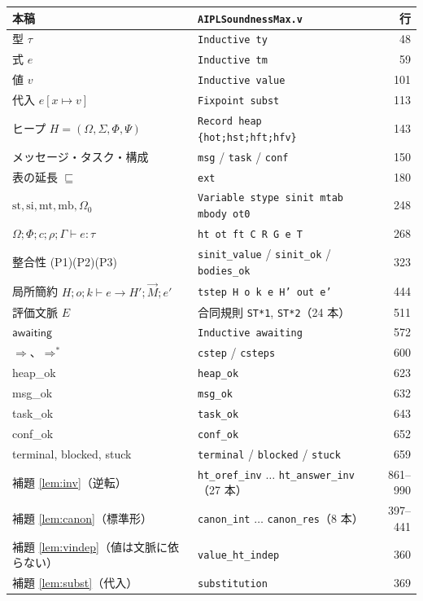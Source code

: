 \documentclass[11pt,a4paper]{ltjsarticle}
\theoremstyle{definition}
\theoremstyle{remark}
\newcommand{\Om}{\Omega}
\newcommand{\Sm}{\Sigma}
\newcommand{\Ph}{\Phi}
\newcommand{\Ps}{\Psi}
\newcommand{\styp}{\mathrm{st}}
\newcommand{\mtab}{\mathrm{mt}}
\newcommand{\mbody}{\mathrm{mb}}
\newcommand{\sinit}{\mathrm{si}}
\newcommand{\heapok}{\textsf{heap\_ok}}
\newcommand{\msgok}{\textsf{msg\_ok}}
\newcommand{\taskok}{\textsf{task\_ok}}
\newcommand{\confok}{\textsf{conf\_ok}}
\newcommand{\stuck}{\textsf{stuck}}
\newcommand{\blocked}{\textsf{blocked}}
\newcommand{\terminal}{\textsf{terminal}}
\newcommand{\awaiting}{\textsf{awaiting}}
\newcommand{\cstep}{\Longrightarrow}
\newcommand{\subs}[2]{[#1 \mapsto #2]}
\begin{document}
\begin{longtable}{p{}p{}r}
\toprule
本稿 & \texttt{AIPLSoundnessMax.v} & 行 \\
\midrule
\endhead
型 $\tau$ & \texttt{Inductive ty} & 48 \\
式 $e$ & \texttt{Inductive tm} & 59 \\
値 $v$ & \texttt{Inductive value} & 101 \\
代入 $e\subs{x}{v}$ & \texttt{Fixpoint subst} & 113 \\
ヒープ $H=(\Om,\Sm,\Ph,\Ps)$ & \texttt{Record heap \{hot;hst;hft;hfv\}} & 143 \\
メッセージ・タスク・構成 & \texttt{msg} / \texttt{task} / \texttt{conf} & 150 \\
表の延長 $\sqsubseteq$ & \texttt{ext} & 180 \\
$\styp,\sinit,\mtab,\mbody,\Om_0$ & \texttt{Variable stype sinit mtab mbody ot0} & 248 \\
$\Om;\Ph;c;\rho;\Gamma \vdash e:\tau$ & \texttt{ht ot ft C R G e T} & 268 \\
整合性 (P1)(P2)(P3) & \texttt{sinit\_value} / \texttt{sinit\_ok} / \texttt{bodies\_ok} & 323 \\
局所簡約 $H;o;k \vdash e \to H';\vec{M};e'$ & \texttt{tstep H o k e H' out e'} & 444 \\
評価文脈 $E$ & 合同規則 \texttt{ST*1}, \texttt{ST*2}（24 本） & 511 \\
$\awaiting$ & \texttt{Inductive awaiting} & 572 \\
$\cstep$、$\cstep^{*}$ & \texttt{cstep} / \texttt{csteps} & 600 \\
\heapok & \texttt{heap\_ok} & 623 \\
\msgok & \texttt{msg\_ok} & 632 \\
\taskok & \texttt{task\_ok} & 643 \\
\confok & \texttt{conf\_ok} & 652 \\
\terminal, \blocked, \stuck & \texttt{terminal} / \texttt{blocked} / \texttt{stuck} & 659 \\
\midrule
補題 \ref{lem:inv}（逆転） & \texttt{ht\_oref\_inv} $\ldots$ \texttt{ht\_answer\_inv}（27 本） & 861--990 \\
補題 \ref{lem:canon}（標準形） & \texttt{canon\_int} $\ldots$ \texttt{canon\_res}（8 本） & 397--441 \\
補題 \ref{lem:vindep}（値は文脈に依らない） & \texttt{value\_ht\_indep} & 360 \\
補題 \ref{lem:subst}（代入） & \texttt{substitution} & 369 \\

\end{longtable}
\end{document}
